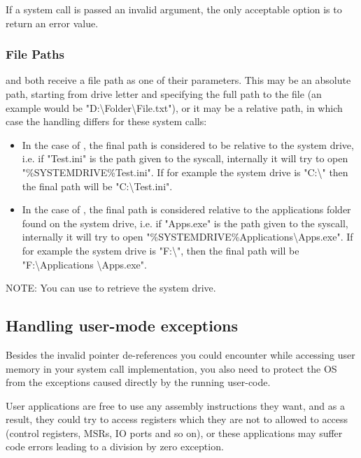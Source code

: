 If a system call is passed an invalid argument, the only acceptable option is to return an error
value.

\subsubsection{File Paths}

 and  both receive a file path as one of their
parameters. This may be an absolute path, starting from drive letter and specifying the full path
to the file (an example would be "D:\textbackslash Folder\textbackslash File.txt"), or it may be a
relative path, in which case the handling differs for these system calls:
\begin{itemize}
	\item In the case of , the final path is considered to be relative to the
system drive, i.e. if "Test.ini" is the path given to the syscall, internally it will try to open
"\%SYSTEMDRIVE\%Test.ini". If for example the system drive  is "C:\textbackslash" then the final path will be "C:\textbackslash Test.ini".

	\item In the case of , the final path is considered relative to the
applications folder found on the system drive, i.e. if "Apps.exe" is the path given to the syscall,
internally it will try to open "\%SYSTEMDRIVE\%Applications\textbackslash Apps.exe". If for example the system drive is "F:\textbackslash",
then the final path will be "F:\textbackslash Applications \textbackslash Apps.exe".
\end{itemize}

NOTE: You can use  to retrieve the system drive.

\subsection{Handling user-mode exceptions}
\label{sect:UserExceptions}

Besides the invalid pointer de-references you could encounter while accessing user memory in your
system call implementation, you also need to protect the OS from the exceptions caused directly by
the running user-code.

User applications are free to use any assembly instructions they want, and as a result, they could try
to access registers which they are not to allowed to access (control registers, MSRs, IO ports and
so on), or these applications may suffer code errors leading to a division by zero exception.

